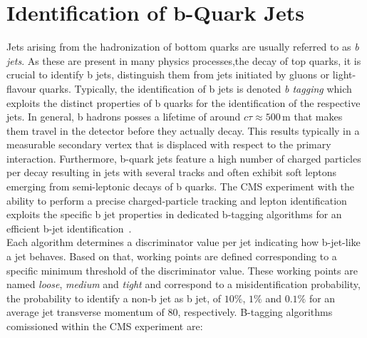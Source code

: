 \section{Identification of b-Quark Jets}
\label{sec:btagging}
Jets arising from the hadronization of bottom quarks are usually referred to as \textit{b jets}. As these are present in many physics processes,\eg the decay of top quarks, it is crucial to identify b jets, \ie distinguish them from jets initiated by gluons or light-flavour quarks. Typically, the identification of b jets is denoted \textit{b tagging} which exploits the distinct properties of b quarks for the identification of the respective jets. In general, b hadrons posses a lifetime of around $c\tau \approx 500$\,\textmu m that makes them travel in the detector before they actually decay. This results typically in a measurable secondary vertex that is displaced with respect to the primary interaction. Furthermore, b-quark jets feature a high number of charged particles per decay resulting in jets with several tracks and often exhibit soft leptons emerging from semi-leptonic decays of b quarks. The CMS experiment with the ability to perform a precise charged-particle tracking and lepton identification exploits the specific b jet properties in dedicated b-tagging algorithms for an efficient b-jet identification~\cite{Chatrchyan:2012jua}. \\
Each algorithm determines a discriminator value per jet indicating how b-jet-like a jet behaves. Based on that, working points are defined corresponding to a specific minimum threshold of the discriminator value. These working points are named \textit{loose}, \textit{medium} and \textit{tight} and correspond to a misidentification probability, \ie the probability to identify a non-b jet as b jet, of $10\%$, $1\%$ and $0.1\%$ for an average jet transverse momentum of $80$\gev, respectively. B-tagging algorithms comissioned within the CMS experiment are:
